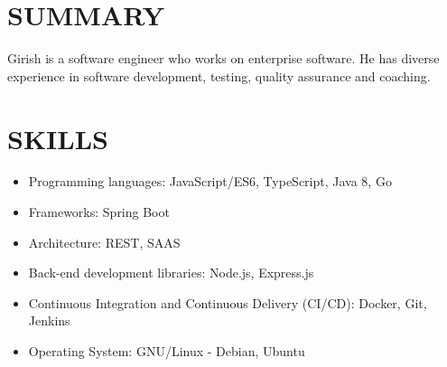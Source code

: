 \documentclass[line, margin]{res}
\begin{document}
\address{\href{mailto:girishm@posteo.net}{girishm@posteo.net} \hspace{5cm}  \hspace{2.5cm} \url{https://girishm.info}}

\begin{resume}
  \section{SUMMARY}
  Girish is a software engineer who works on enterprise software.
  He has diverse experience in software development,
  testing, quality assurance and coaching.
  \section{SKILLS}
    \begin{itemize}
    \item Programming languages: JavaScript/ES6, TypeScript, Java 8, Go
    \item Frameworks: Spring Boot
    \item Architecture: REST, SAAS
    \item Back-end development libraries: Node.js, Express.js
    \item Continuous Integration and Continuous Delivery (CI/CD): Docker, Git, Jenkins
    \item Operating System: GNU/Linux - Debian, Ubuntu
    \end{itemize}

\end{resume}
\end{document}
